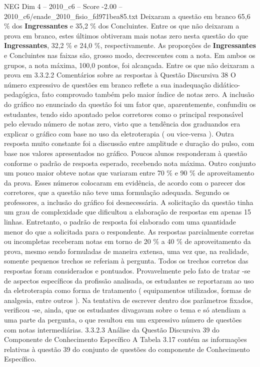 \begin{textsample}{NEG Dim 4 – 2010\_c6 – Score -2.00 – 2010\_c6/enade\_2010\_fisio\_fd971bea85.txt}
Deixaram a questão em branco 65,6 \% dos \textbf{Ingressantes} e 35,2 \% dos Concluintes.
Entre os que não deixaram a prova em branco, estes últimos obtiveram mais notas zero nesta questão do que \textbf{Ingressantes}, 32,2 \% e 24,0 \%, respectivamente.
As proporções de \textbf{Ingressantes} e Concluintes nas faixas são, grosso modo, decrescentes com a nota.
Em ambos os grupos, a nota máxima, 100,0 pontos, foi alcançada.
Entre os que não deixaram a prova em 3.3.2.2 Comentários sobre as respostas à Questão Discursiva 38 O número expressivo de questões em branco reflete a sua inadequação didático-pedagógica, fato comprovado também pelo maior índice de notas zero.
A inclusão do gráfico no enunciado da questão foi um fator que, aparentemente, confundiu os estudantes, tendo sido apontado pelos corretores como o principal responsável pelo elevado número de notas zero, visto que a tendência dos graduandos era explicar o gráfico com base no uso da eletroterapia ( ou vice-versa ).
Outra resposta muito constante foi a discussão entre amplitude e duração do pulso, com base nos valores apresentados no gráfico.
Poucos alunos responderam à questão conforme o padrão de resposta esperado, recebendo nota máxima.
Outro conjunto um pouco maior obteve notas que variaram entre 70 \% e 90 \% de aproveitamento da prova.
Esses números colocaram em evidência, de acordo com o parecer dos corretores, que a questão não teve uma formulação adequada.
Segundo os professores, a inclusão do gráfico foi desnecessária.
A solicitação da questão tinha um grau de complexidade que dificultou a elaboração de respostas em apenas 15 linhas.
Entretanto, o padrão de resposta foi elaborado com uma quantidade menor do que a solicitada para o respondente.
As respostas parcialmente corretas ou incompletas receberam notas em torno de 20 \% a 40 \% de aproveitamento da prova, mesmo sendo formuladas de maneira extensa, uma vez que, na realidade, somente pequenos trechos se referiam à pergunta.
Todos os trechos corretos das respostas foram considerados e pontuados.
Provavelmente pelo fato de tratar -se de aspectos específicos da profissão analisada, os estudantes se reportaram ao uso da eletroterapia como forma de tratamento ( equipamentos utilizados, formas de analgesia, entre outros ).
Na tentativa de escrever dentro dos parâmetros fixados, verificou -se, ainda, que os estudantes divagavam sobre o tema e só atendiam a uma parte da pergunta, o que resultou em um expressivo número de questões com notas intermediárias. 3.3.2.3 Análise da Questão Discursiva 39 do Componente de Conhecimento Específico A Tabela 3.17 contém as informações relativas à questão 39 do conjunto de questões do componente de Conhecimento Específico.

\end{textsample}

